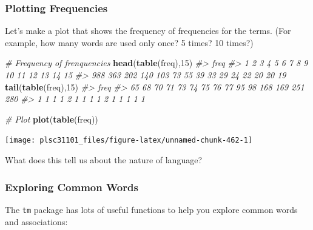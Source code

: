 \documentclass[
]{book}
\newenvironment{Shaded}{\begin{snugshade}}{\end{snugshade}}
\newcommand{\CommentTok}[1]{\textcolor[rgb]{0.56,0.35,0.01}{\textit{#1}}}
\newcommand{\DecValTok}[1]{\textcolor[rgb]{0.00,0.00,0.81}{#1}}
\newcommand{\KeywordTok}[1]{\textcolor[rgb]{0.13,0.29,0.53}{\textbf{#1}}}
\newcommand{\NormalTok}[1]{#1}
\begin{document}
\hypertarget{plotting-frequencies}{%
\subsubsection*{Plotting Frequencies}\label{plotting-frequencies}}

Let's make a plot that shows the frequency of frequencies for the terms. (For example, how many words are used only once? 5 times? 10 times?)

\begin{Shaded}
\begin{Highlighting}[]
\CommentTok{# Frequency of frenquencies}
\KeywordTok{head}\NormalTok{(}\KeywordTok{table}\NormalTok{(freq),}\DecValTok{15}\NormalTok{)}
\CommentTok{#> freq}
\CommentTok{#>   1   2   3   4   5   6   7   8   9  10  11  12  13  14  15 }
\CommentTok{#> 988 363 202 140 103  73  55  39  33  29  24  22  20  20  19}
\KeywordTok{tail}\NormalTok{(}\KeywordTok{table}\NormalTok{(freq),}\DecValTok{15}\NormalTok{)}
\CommentTok{#> freq}
\CommentTok{#>  65  68  70  71  73  74  75  76  77  95  98 168 169 251 280 }
\CommentTok{#>   1   1   1   1   2   1   1   1   1   2   1   1   1   1   1}

\CommentTok{# Plot}
\KeywordTok{plot}\NormalTok{(}\KeywordTok{table}\NormalTok{(freq))}
\end{Highlighting}
\end{Shaded}

\begin{center}\texttt{[image: plsc31101\_files/figure-latex/unnamed-chunk-462-1]} \end{center}

What does this tell us about the nature of language?

\hypertarget{exploring-common-words}{%
\subsubsection*{Exploring Common Words}\label{exploring-common-words}}

The \texttt{tm} package has lots of useful functions to help you explore common words and associations:
\end{document}
